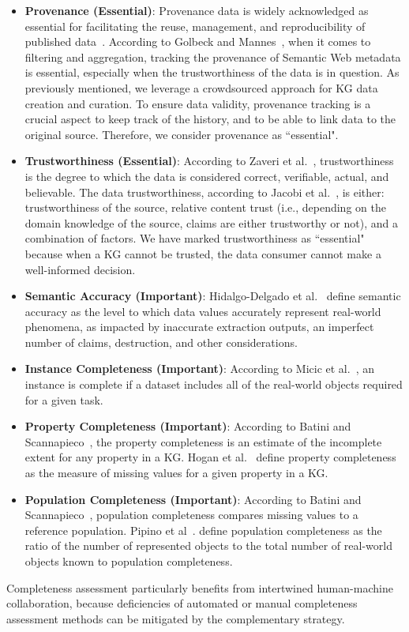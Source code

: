 \documentclass[runningheads]{llncs}
\begin{document}
\begin{itemize}
  \item \textbf {Provenance (Essential)}: 
  Provenance data is widely acknowledged as essential for facilitating the reuse, management, and reproducibility of published data~\cite{Simmhan05asurvey}.
  According to Golbeck and Mannes~\cite{Golbeck2006UsingTA}, when it comes to filtering and aggregation, tracking the provenance of Semantic Web metadata is essential, especially when the trustworthiness of the data is in question.
  As previously mentioned, we leverage a crowdsourced approach for KG data creation and curation. To ensure data validity, provenance tracking is a crucial aspect to keep track of the history, and to be able to link data to the original source. Therefore, we consider provenance as ``essential". 
  \item \textbf {Trustworthiness (Essential)}: 
   According to Zaveri et al.~\cite{zaveri2016quality}, trustworthiness is the degree to which the data is considered correct, verifiable, actual, and believable. The data trustworthiness, according to Jacobi et al.~\cite{bassiliades_rule-based_2011}, is either: trustworthiness of the source, relative content trust (i.e., depending on the domain knowledge of the source, claims are either trustworthy or not), and a combination of factors. 
    We have marked trustworthiness as ``essential" because when a KG cannot be trusted, the data consumer cannot make a well-informed decision.
  \item \textbf {Semantic Accuracy (Important)}:
  Hidalgo-Delgado et al.~\cite{Hidalgo-Delgado_quality_2021} define semantic accuracy as the level to which data values accurately represent real-world phenomena, as impacted by inaccurate extraction outputs, an imperfect number of claims, destruction, and other considerations.
  \item \textbf{Instance Completeness (Important)}: According to Micic et al.~\cite{Micic2017TowardsAD}, an instance is complete if a dataset includes all of the real-world objects required for a given task.
  \item \textbf{Property Completeness (Important)}:
  According to Batini and Scannapieco~\cite{Batinidata2006}, the property completeness is an estimate of the incomplete extent for any property in a KG.
  Hogan et al.~\cite{hogan_knowledge_2022} define property completeness as the measure of missing values for a given property in a KG.
\item \textbf{Population Completeness (Important)}:
  According to Batini and Scannapieco~\cite{Batinidata2006}, population completeness compares missing values to a reference population. 
  Pipino et al~\cite{PipinoData}. define population completeness as the ratio of the number of represented objects to the total number of real-world objects known to population completeness.
\end{itemize}
Completeness assessment particularly benefits from intertwined human-machine collaboration, because deficiencies of automated or manual completeness assessment methods can be mitigated by the complementary strategy.
  
\end{document}
